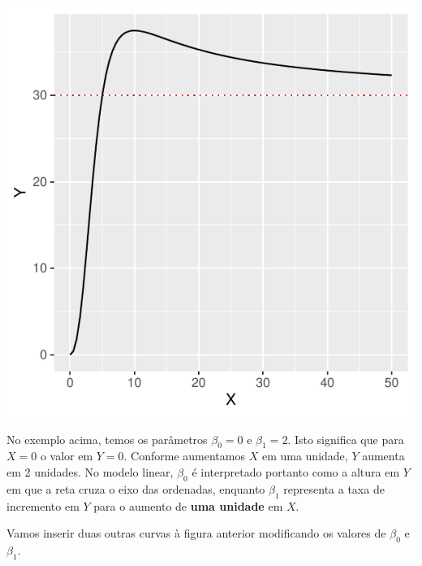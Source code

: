 \documentclass[
]{book}
\begin{document}
\begin{center}\includegraphics{probest-cambientais_files/figure-latex/unnamed-chunk-219-1} \end{center}

No exemplo acima, temos os parâmetros \(\beta_0 = 0\) e \(\beta_1 = 2\). Isto significa que para \(X = 0\) o valor em \(Y = 0\). Conforme aumentamos \(X\) em uma unidade, \(Y\) aumenta em 2 unidades. No modelo linear, \(\beta_0\) é interpretado portanto como a altura em \(Y\) em que a reta cruza o eixo das ordenadas, enquanto \(\beta_1\) representa a taxa de incremento em \(Y\) para o aumento de \textbf{uma unidade} em \(X\).

Vamos inserir duas outras curvas à figura anterior modificando os valores de \(\beta_0\) e \(\beta_1\).
\end{document}
